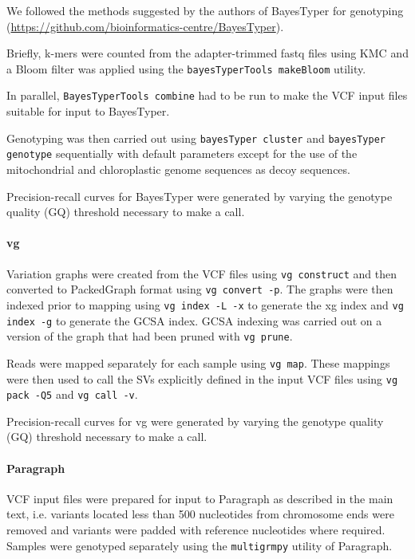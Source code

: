\documentclass[12pt]{article}
\begin{document}
We followed the methods suggested by the authors of BayesTyper for genotyping (\url{https://github.com/bioinformatics-centre/BayesTyper}).

Briefly, k-mers were counted from the adapter-trimmed fastq files using KMC \citep{kmc} and a Bloom filter was applied using the \texttt{bayesTyperTools makeBloom} utility.

In parallel, \texttt{BayesTyperTools combine} had to be run to make the VCF input files suitable for input to BayesTyper.

Genotyping was then carried out using \texttt{bayesTyper cluster} and \texttt{bayesTyper genotype} sequentially with default parameters except for the use of the mitochondrial and chloroplastic genome sequences as decoy sequences.

Precision-recall curves for BayesTyper were generated by varying the genotype quality (GQ) threshold necessary to make a call.

\paragraph{vg}

Variation graphs were created from the VCF files using \texttt{vg construct} and then converted to PackedGraph format using \texttt{vg convert -p}. The graphs were then indexed prior to mapping using \texttt{vg index -L -x} to generate the xg index and \texttt{vg index -g} to generate the GCSA index. GCSA indexing was carried out on a version of the graph that had been pruned with \texttt{vg prune}.

Reads were mapped separately for each sample using \texttt{vg map}. These mappings were then used to call the SVs explicitly defined in the input VCF files using \texttt{vg pack -Q5} and \texttt{vg call -v}.

Precision-recall curves for vg were generated by varying the genotype quality (GQ) threshold necessary to make a call.

\paragraph{Paragraph}

VCF input files were prepared for input to Paragraph as described in the main text, i.e. variants located less than 500 nucleotides from chromosome ends were removed and variants were padded with reference nucleotides where required. Samples were genotyped separately using the \texttt{multigrmpy} utility of Paragraph.
\end{document}
